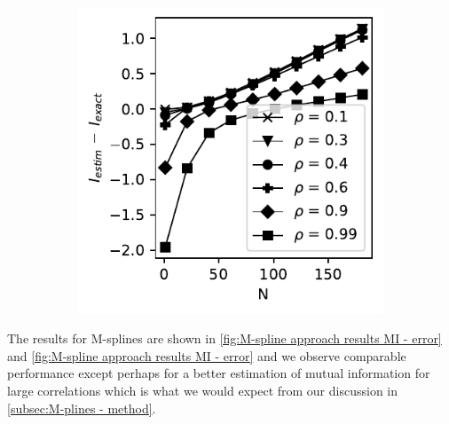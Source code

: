\documentclass[../Thesis.tex]{subfiles}
\begin{document}
\begin{figure}[H]
\begin{subfigure}[t]{0.4\textwidth}
        \includegraphics[width=\linewidth]{figures/ND examples/MI calc/gaussian example original high corr - B-spline - error.pdf}
        \caption{}
    \end{subfigure}
    \caption{}
    \label{fig:B-spline approach results MI - error}
\end{figure}
The results for M-splines are shown in \autoref{fig:M-spline approach results MI - error} and \autoref{fig:M-spline approach results MI - error} and we observe comparable performance except perhaps for a better estimation of mutual information for large correlations which is what we would expect from our discussion in \autoref{subsec:M-plines - method}.
\end{document}
